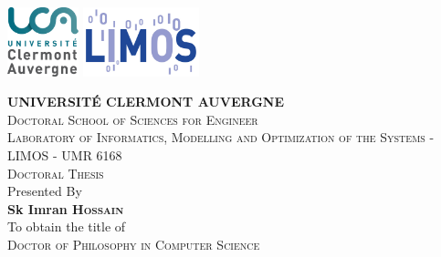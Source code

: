 \begin{titlepage}

	\begin{center}
		\begin{minipage}[t]{\textwidth}
			\includegraphics[height=2cm]{images/logo-uca.png}\hfill
			\includegraphics[height=2cm]{images/logo-limos.png}
		\end{minipage}%

		\vspace{0.6cm}
		\LARGE \textsc{\textbf{UNIVERSITÉ CLERMONT AUVERGNE}}\\
		\vspace{0.4cm}
		\normalsize \textsc{Doctoral School of Sciences for Engineer}\\
		\vspace{0.4cm}
		\normalsize \textsc{Laboratory of Informatics, Modelling and Optimization of the Systems - LIMOS - UMR 6168}\\

		\vspace{0.6cm}
		\Large \textsc{Doctoral Thesis}\\
		\vspace{0.6cm}
		\normalsize Presented By \\
		\LARGE \textbf{Sk Imran \textsc{Hossain}}\\
		\vspace{0.4cm}
		\normalsize To obtain the title of\\
		\Large \textsc{Doctor of Philosophy in Computer Science}


\end{center}
\end{titlepage}
